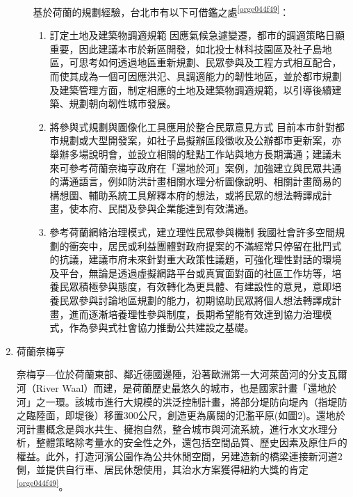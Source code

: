 \documentclass[a4paper,12pt]{article}
\begin{document}
\begin{enumerate}
\begin{enumerate}
基於荷蘭的規劃經驗，台北市有以下可借鑑之處\textsuperscript{\ref{orge044f49}}：\\
\begin{enumerate}
\item 訂定土地及建築物調適規範   因應氣候急遽變遷，都市的調適策略日顯重要，因此建議本市於新區開發，如北投士林科技園區及社子島地區，可思考如何透過地區重新規劃、民眾參與及工程方式相互配合，而使其成為一個可因應洪氾、具調適能力的韌性地區，並於都市規劃及建築管理方面，制定相應的土地及建築物調適規範，以引導後續建築、規劃朝向韌性城市發展。\\
\item 將參與式規劃與圖像化工具應用於整合民眾意見方式   目前本市針對都市規劃或大型開發案，如社子島擬辦區段徵收及公辦都市更新案，亦舉辦多場說明會，並設立相關的駐點工作站與地方長期溝通；建議未來可參考荷蘭奈梅亨政府在「還地於河」案例，加強建立與民眾共通的溝通語言，例如防洪計畫相關水理分析圖像說明、相關計畫簡易的構想圖、輔助系統工具解釋本府的想法，或將民眾的想法轉譯成計畫，使本府、民間及參與企業能達到有效溝通。\\
\item 參考荷蘭網絡治理模式，建立理性民眾參與機制   我國社會許多空間規劃的衝突中，居民或利益團體對政府提案的不滿經常只停留在批鬥式的抗議，建議市府未來針對重大政策性議題，可強化理性對話的環境及平台，無論是透過虛擬網路平台或真實面對面的社區工作坊等，培養民眾積極參與態度，有效轉化為更具體、有建設性的意見，意即培養民眾參與討論地區規劃的能力，初期協助民眾將個人想法轉譯成計畫，進而逐漸培養理性參與制度，長期希望能有效達到協力治理模式，作為參與式社會協力推動公共建設之基礎。\\
\end{enumerate}
\end{enumerate}

\item 荷蘭奈梅亨
\label{sec:orgfc9d2ef}

奈梅亨—位於荷蘭東部、鄰近德國邊陲，沿著歐洲第一大河萊茵河的分支瓦爾河（River Waal）而建，是荷蘭歷史最悠久的城市，也是國家計畫「還地於河」之一環。該城市進行大規模的洪泛控制計畫，將部分堤防向堤內（指堤防之臨陸面，即堤後）移置300公尺，創造更為廣闊的氾濫平原(如圖2)。還地於河計畫概念是與水共生、擁抱自然，整合城市與河流系統，進行水文水理分析，整體策略除考量水的安全性之外，還包括空間品質、歷史因素及原住戶的權益。此外，打造河濱公園作為公共休閒空間，另建造新的橋梁連接新河道2側，並提供自行車、居民休憩使用，其治水方案獲得紐約大獎的肯定\textsuperscript{\ref{orge044f49}}。\\


\end{enumerate}
\end{document}

